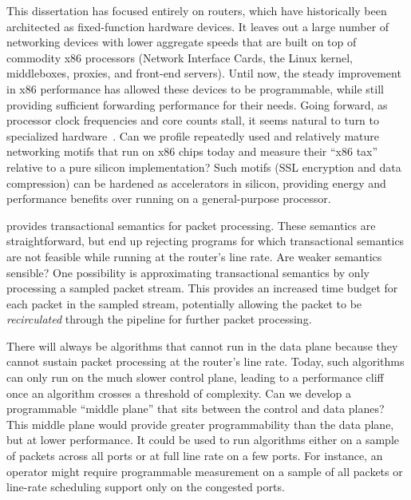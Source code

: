  This dissertation has focused entirely on
routers, which have historically been architected as fixed-function hardware
devices. It leaves out a large number of networking devices with lower
aggregate speeds that are built on top of commodity x86 processors (\eg Network
Interface Cards, the Linux kernel, middleboxes, proxies, and front-end servers). Until
now, the steady improvement in x86 performance has allowed these devices to be
programmable, while still providing sufficient forwarding performance for their
needs. Going forward, as processor clock frequencies and core
counts stall, it seems natural to turn to specialized hardware~\cite{dark_silicon, four_horsemen}. Can we profile repeatedly used and relatively mature networking motifs
that run on x86 chips today and measure their ``x86 tax'' relative to a pure
silicon implementation? Such motifs (\eg SSL encryption and data compression)
can be hardened as accelerators in silicon, providing energy and performance
benefits over running on a general-purpose processor.


 \pktlanguage provides
transactional semantics for packet processing. These semantics are
straightforward, but end up rejecting programs for which transactional
semantics are not feasible while running at the router's line rate.  Are weaker
semantics sensible? One possibility is approximating transactional semantics by
only processing a sampled packet stream.  This provides an increased time
budget for each packet in the sampled stream, potentially allowing the packet
to be {\em recirculated} through the pipeline for further packet
processing.

 There will always be algorithms that
cannot run in the data plane because they cannot sustain packet processing at
the router's line rate. Today, such algorithms can only run on the much slower
control plane, leading to a performance cliff once an algorithm crosses a
threshold of complexity. Can we develop a programmable ``middle plane'' that sits
between the control and data planes? This middle plane would provide greater
programmability than the data plane, but at lower performance. It could be used
to run algorithms either on a sample of packets across all ports or at full
line rate on a few ports. For instance, an operator might require programmable
measurement on a sample of all packets or line-rate scheduling support only on
the congested ports.

